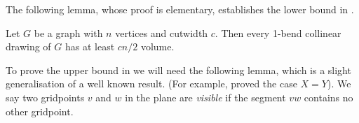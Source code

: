 \documentclass[10pt,twocolumn]{article}
\begin{document}



The following lemma, whose proof is elementary, establishes the lower bound in
.

\begin{lemma}
Let $G$ be a graph with $n$ vertices and cutwidth $c$. Then
every 1-bend collinear drawing of $G$ has at least $cn/2$ volume.
\end{lemma}

%
%
%


To prove the upper bound in  we will need the
following lemma, which is a slight generalisation of a well known result. (For
example, \citet{PTT99} proved the case $X=Y$). We say two gridpoints $v$
and $w$ in the plane are \emph{visible} if the segment $vw$ contains no other
gridpoint.
\end{document}
